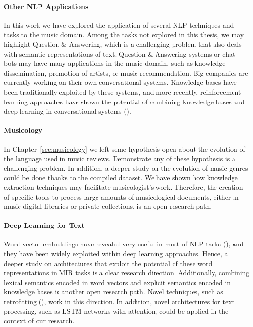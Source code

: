 \paragraph{Other NLP Applications} In this work we have explored the application of several NLP techniques and tasks to the music domain. Among the tasks not explored in this thesis, we may highlight Question \& Answering, which is a challenging problem that also deals with semantic representations of text. Question \& Answering systems or chat bots may have many applications in the music domain, such as knowledge dissemination, promotion of artists, or music recommendation. Big companies are currently working on their own conversational systems. Knowledge bases have been traditionally exploited by these systems, and more recently, reinforcement learning approaches have shown the potential of combining knowledge bases and deep learning in conversational systems (\cite{andreas2016learning}).

\paragraph{Musicology}
In Chapter~\ref{sec:musicology} we left some hypothesis open about the evolution of the language used in music reviews. Demonstrate any of these hypothesis is a challenging problem. In addition, a deeper study on the evolution of music genres could be done thanks to the compiled dataset. We have shown how knowledge extraction techniques may facilitate musicologist's work. Therefore, the creation of specific tools to process large amounts of musicological documents, either in music digital libraries or private collections, is an open research path.

\paragraph{Deep Learning for Text} Word vector embeddings have revealed very useful in most of NLP tasks (\cite{Collobert2011}), and they have been widely exploited within deep learning approaches. Hence, a deeper study on architectures that exploit the potential of these word representations in MIR tasks is a clear research direction. Additionally, combining lexical semantics encoded in word vectors and explicit semantics encoded in knowledge bases is another open research path. Novel techniques, such as retrofitting (\cite{faruqui2014retrofitting}), work in this direction. In addition, novel architectures for text processing, such as LSTM networks with attention, could be applied in the context of our research.


